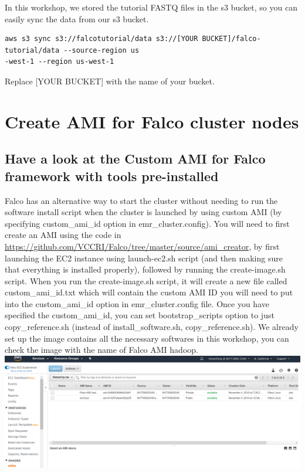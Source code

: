 \documentclass[
]{book}
\begin{document}
In this workshop, we stored the tutorial FASTQ files in the s3 bucket, so you can easily sync the data from our s3 bucket.

\begin{verbatim}
aws s3 sync s3://falcotutorial/data s3://[YOUR BUCKET]/falco-tutorial/data --source-region us
-west-1 --region us-west-1
\end{verbatim}

Replace {[}YOUR BUCKET{]} with the name of your bucket.

\hypertarget{create-ami-for-falco-cluster-nodes}{%
\chapter{Create AMI for Falco cluster nodes}\label{create-ami-for-falco-cluster-nodes}}

\hypertarget{have-a-look-at-the-custom-ami-for-falco-framework-with-tools-pre-installed}{%
\section{Have a look at the Custom AMI for Falco framework with tools pre-installed}\label{have-a-look-at-the-custom-ami-for-falco-framework-with-tools-pre-installed}}

Falco has an alternative way to start the cluster without needing to run the software install script when the cluster is launched by using custom AMI (by specifying custom\_ami\_id option in emr\_cluster.config). You will need to first create an AMI using the code in \url{https://github.com/VCCRI/Falco/tree/master/source/ami_creator}, by first launching the EC2 instance using launch-ec2.sh script (and then making sure that everything is installed properly), followed by running the create-image.sh script. When you run the create-image.sh script, it will create a new file called custom\_ami\_id.txt which will contain the custom AMI ID you will need to put into the custom\_ami\_id option in emr\_cluster.config file. Once you have specified the custom\_ami\_id, you can set bootstrap\_scripts option to just copy\_reference.sh (instead of install\_software.sh, copy\_reference.sh).
We already set up the image contains all the necessary softwares in this workshop, you can check the image with the name of Falco AMI hadoop.
\includegraphics{falcoimage.PNG}
\end{document}
